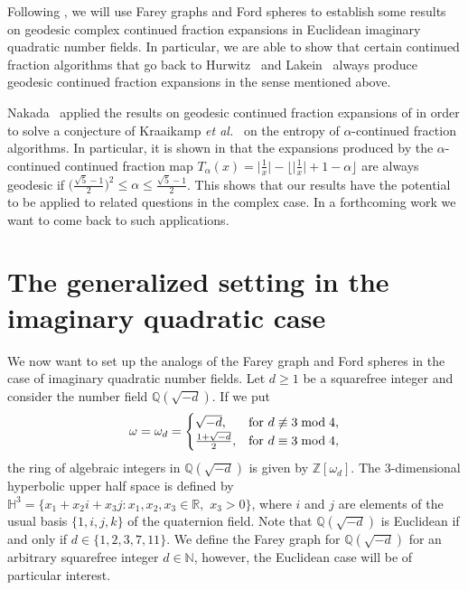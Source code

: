 \documentclass[graybox]{svmult}
\begin{document}
Following \cite{B-H-S,H-1,H-2}, we will use Farey graphs and Ford spheres to establish some results on geodesic complex continued fraction expansions in Euclidean imaginary quadratic number fields. In particular, we are able to show that certain continued fraction algorithms that go back to Hurwitz~\cite{H:1887} and Lakein~\cite{lakein1973approximation} always produce geodesic continued fraction expansions in the sense mentioned above.

Nakada~\cite{N2} applied the results on geodesic continued fraction expansions of \cite{B-H-S} in order to solve a conjecture of Kraaikamp {\em et al.}~\cite{KSS} on the entropy of $\alpha$-continued fraction algorithms. In particular, it is shown in \cite[Theorem~1]{N2} that the expansions produced by the $\alpha$-continued continued fraction map $T_\alpha(x) = \big| \frac1x\big| - \big\lfloor \big| \frac1x\big| + 1 - \alpha \big\rfloor$ are always geodesic if $\big(\tfrac{\sqrt 5 - 1}{2}\big)^2 \le \alpha \le \tfrac{\sqrt 5 - 1}{2}$. This shows that our results have the potential to be applied to related questions in the complex case. In a forthcoming work we want to come back to such applications.

\section{The generalized setting in the imaginary quadratic case}\label{sec:2}

We now want to set up the analogs of the Farey graph and Ford spheres in the case of imaginary quadratic number fields.
Let $d\ge 1$ be a squarefree integer and consider the number field $\mathbb{Q}(\sqrt{-d})$. If we put
\[
\omega=\omega_d=\begin{cases}
\sqrt{-d}, & \hbox{for } d \not\equiv 3\bmod 4, \\
\frac{1+\sqrt{-d}}2, & \hbox{for } d \equiv 3\bmod 4,
\end{cases}
\] 
the ring of algebraic integers in $\mathbb Q(\sqrt{-d})$ is given by 
$\mathbb{Z}[\omega_d]$. The $3$-dimensional hyperbolic upper half space is defined by $\mathbb H^{3} = \{x_{1} + x_{2}{i} + x_{3}{j} : 
x_{1}, x_{2}, x_{3} \in \mathbb R, \,\, x_{3}> 0 \}$, where $i$ and $j$ are elements of the usual basis $\{1, i, j, k\}$ of the quaternion field.   Note that $\mathbb Q(\sqrt{-d})$ is Euclidean if and only if $d\in \{1, 2, 3, 7, 11\}$.   We define the Farey graph for $\mathbb Q(\sqrt{-d})$ for an arbitrary squarefree integer $d\in\mathbb{N}$, however, the Euclidean case will be of particular interest.
\end{document}
